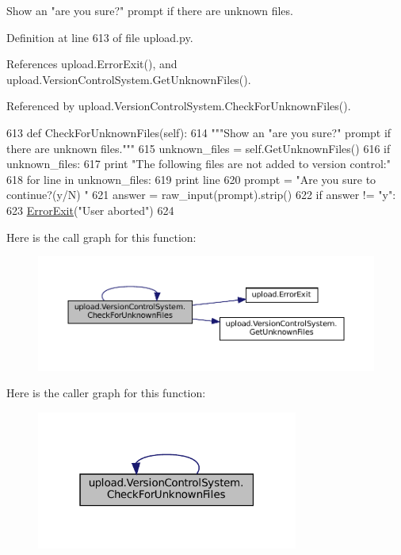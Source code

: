 \begin{DoxyVerb}Show an "are you sure?" prompt if there are unknown files.\end{DoxyVerb}
 

Definition at line 613 of file upload.\+py.



References upload.\+Error\+Exit(), and upload.\+Version\+Control\+System.\+Get\+Unknown\+Files().



Referenced by upload.\+Version\+Control\+System.\+Check\+For\+Unknown\+Files().


\begin{DoxyCode}
613   \textcolor{keyword}{def }CheckForUnknownFiles(self):
614     \textcolor{stringliteral}{"""Show an "are you sure?" prompt if there are unknown files."""}
615     unknown\_files = self.GetUnknownFiles()
616     \textcolor{keywordflow}{if} unknown\_files:
617       \textcolor{keywordflow}{print} \textcolor{stringliteral}{"The following files are not added to version control:"}
618       \textcolor{keywordflow}{for} line \textcolor{keywordflow}{in} unknown\_files:
619         \textcolor{keywordflow}{print} line
620       prompt = \textcolor{stringliteral}{"Are you sure to continue?(y/N) "}
621       answer = raw\_input(prompt).strip()
622       \textcolor{keywordflow}{if} answer != \textcolor{stringliteral}{"y"}:
623         \hyperlink{namespaceupload_adea53186a1d73e92cc839b7c35c2c044}{ErrorExit}(\textcolor{stringliteral}{"User aborted"})
624 
\end{DoxyCode}
Here is the call graph for this function\+:
\nopagebreak
\begin{figure}[H]
\begin{center}
\leavevmode
\includegraphics[width=350pt]{classupload_1_1VersionControlSystem_ad2923d691a1b1047e9359c5b7c1c103f_cgraph}
\end{center}
\end{figure}
Here is the caller graph for this function\+:
\nopagebreak
\begin{figure}[H]
\begin{center}
\leavevmode
\includegraphics[width=244pt]{classupload_1_1VersionControlSystem_ad2923d691a1b1047e9359c5b7c1c103f_icgraph}
\end{center}
\end{figure}
